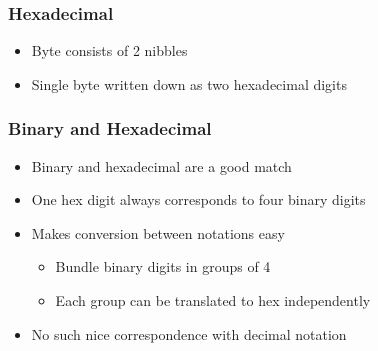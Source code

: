 \begin{frame}
  \frametitle{Hexadecimal}
  \begin{center}
  \end{center}
  \begin{itemize}
    \item Byte consists of 2 nibbles
    \item Single byte written down as two hexadecimal digits
  \end{itemize}
\end{frame}

\begin{frame}
  \frametitle{Binary and Hexadecimal}
  \begin{itemize}
    \item Binary and hexadecimal are a good match
    \item One hex digit always corresponds to four binary digits
    \item Makes conversion between notations easy
          \begin{itemize}
            \item Bundle binary digits in groups of 4
            \item Each group can be translated to hex independently
          \end{itemize}
    \item No such nice correspondence with decimal notation
  \end{itemize}
\end{frame}

